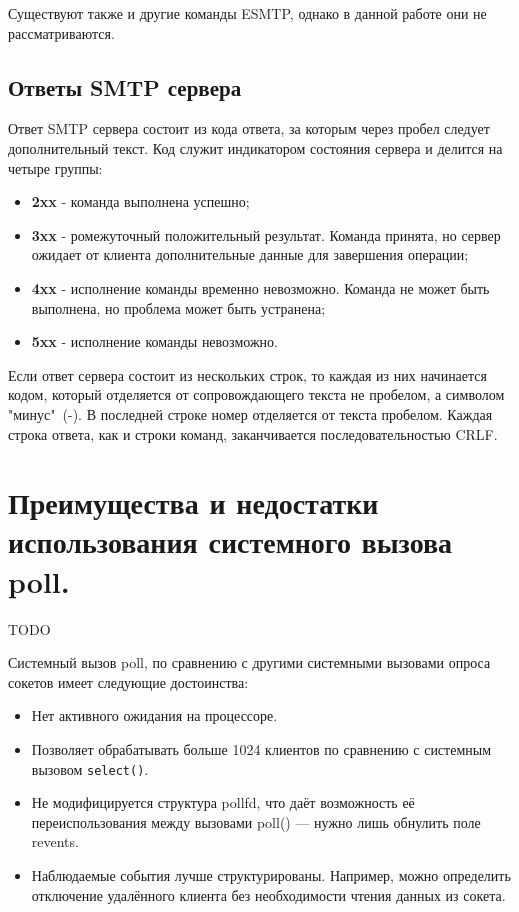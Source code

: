 \documentclass[a4paper,12pt]{report}
\begin{document}
Существуют также и другие команды ESMTP, однако в данной работе они не рассматриваются. 

\subsection{Ответы SMTP сервера}

Ответ SMTP сервера состоит из кода ответа, за которым через пробел следует дополнительный текст. Код служит индикатором состояния сервера и делится на четыре группы:
\begin{itemize}
	\item \textbf{2xx} - команда выполнена успешно;
	\item \textbf{3xx} - ромежуточный положительный результат. Команда принята, но сервер ожидает от клиента дополнительные данные для завершения операции;
	\item \textbf{4xx} - исполнение команды временно невозможно. Команда не может быть выполнена, но проблема может быть устранена;
	\item \textbf{5xx} - исполнение команды невозможно.
\end{itemize}

Если ответ сервера состоит из нескольких строк, то каждая из них начинается кодом, который отделяется от сопровождающего текста не пробелом, а символом "минус"\ (-). В последней строке номер отделяется от текста пробелом. Каждая строка ответа, как и строки команд, заканчивается последовательностью CRLF.

\section{Преимущества и недостатки использования системного вызова poll.}
TODO

Системный вызов poll, по сравнению с другими системными вызовами опроса сокетов имеет следующие достоинства: 
\begin{itemize}
	\item Нет активного ожидания на процессоре.
	\item Позволяет обрабатывать больше 1024 клиентов по сравнению с системным вызовом \texttt{select()}.
	\item Не модифицируется структура pollfd, что даёт возможность её переиспользования между вызовами poll() — нужно лишь обнулить поле revents.
	\item Наблюдаемые события лучше структурированы. Например, можно определить отключение удалённого клиента без необходимости чтения данных из сокета.
\end{itemize}
\end{document}
